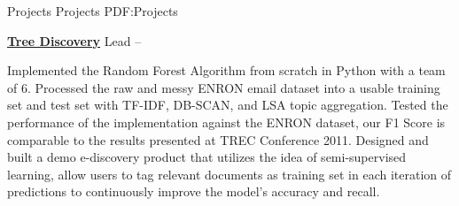 \documentclass[letterpaper,MMMyyyy,nonstopmode]{simpleresumecv}
\begin{document}
\begin{Body}

\Section
{Projects}
{Projects}
{PDF:Projects}

\Entry
\href{https://github.com/xingfanxia/comps_ediscovery}
{\textbf{Tree Discovery}}
\Gap
\BulletItem
Lead
\hfill
{} --

\begin{Detail}
\SubBulletItem
Implemented the Random Forest Algorithm from scratch in Python with a team of 6.
\SubBulletItem
Processed the raw and messy ENRON email dataset into a usable training set and test set with TF-IDF, DB-SCAN, and LSA topic aggregation.
\SubBulletItem
Tested the performance of the implementation against the ENRON dataset, our F1 Score is comparable to the results presented at TREC Conference 2011.
\SubBulletItem
Designed and built a demo e-discovery product that utilizes the idea of semi-supervised learning, allow users to tag relevant documents as training set in each iteration of predictions to continuously improve the model's accuracy and recall.
\end{Detail}







\end{Body}
\end{document}

